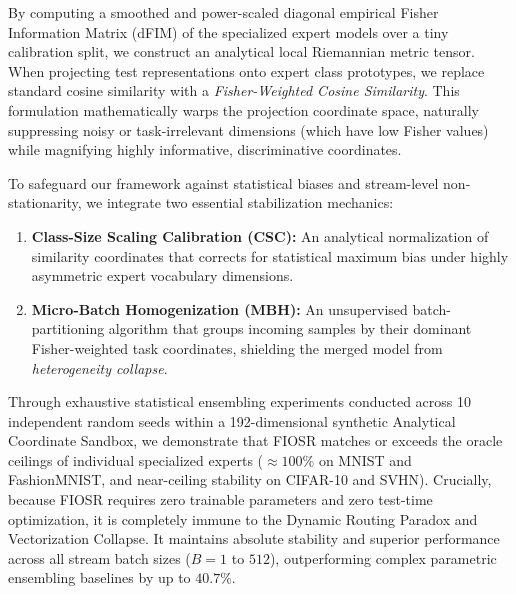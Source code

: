 By computing a smoothed and power-scaled diagonal empirical Fisher Information Matrix (dFIM) of the specialized expert models over a tiny calibration split, we construct an analytical local Riemannian metric tensor. When projecting test representations onto expert class prototypes, we replace standard cosine similarity with a \emph{Fisher-Weighted Cosine Similarity}. This formulation mathematically warps the projection coordinate space, naturally suppressing noisy or task-irrelevant dimensions (which have low Fisher values) while magnifying highly informative, discriminative coordinates.

To safeguard our framework against statistical biases and stream-level non-stationarity, we integrate two essential stabilization mechanics:
\begin{enumerate}\setlength{\itemsep}{0.5pt}\setlength{\parskip}{0pt}
    \item \textbf{Class-Size Scaling Calibration (CSC):} An analytical normalization of similarity coordinates that corrects for statistical maximum bias under highly asymmetric expert vocabulary dimensions.
    \item \textbf{Micro-Batch Homogenization (MBH):} An unsupervised batch-partitioning algorithm that groups incoming samples by their dominant Fisher-weighted task coordinates, shielding the merged model from \emph{heterogeneity collapse}.
\end{enumerate}

Through exhaustive statistical ensembling experiments conducted across 10 independent random seeds within a 192-dimensional synthetic Analytical Coordinate Sandbox, we demonstrate that FIOSR matches or exceeds the oracle ceilings of individual specialized experts ($\approx 100\%$ on MNIST and FashionMNIST, and near-ceiling stability on CIFAR-10 and SVHN). Crucially, because FIOSR requires zero trainable parameters and zero test-time optimization, it is completely immune to the Dynamic Routing Paradox and Vectorization Collapse. It maintains absolute stability and superior performance across all stream batch sizes ($B=1$ to $512$), outperforming complex parametric ensembling baselines by up to $40.7\%$.

